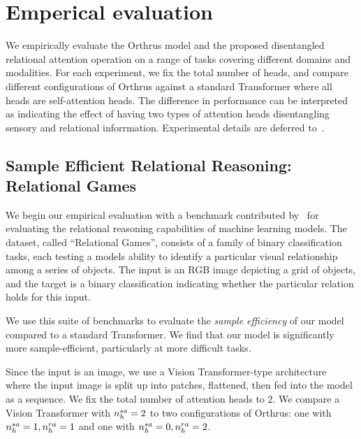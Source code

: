 \section{Emperical evaluation}\label{sec:experiments}

We empirically evaluate the Orthrus model and the proposed disentangled relational attention operation on a range of tasks covering different domains and modalities. For each experiment, we fix the total number of heads, and compare different configurations of Orthrus against a standard Transformer where all heads are self-attention heads. The difference in performance can be interpreted as indicating the effect of having two types of attention heads disentangling sensory and relational inforrmation. Experimental details are deferred to~.

\subsection{Sample Efficient Relational Reasoning: Relational Games}\label{ssec:relgames}

We begin our empirical evaluation with a benchmark contributed by~\citet{shanahanExplicitlyRelationalNeurala} for evaluating the relational reasoning capabilities of machine learning models. The dataset, called ``Relational Games'', consists of a family of binary classification tasks, each testing a models ability to identify a particular visual relationship among a series of objects. The input is an RGB image depicting a grid of objects, and the target is a binary classification indicating whether the particular relation holds for this input.


We use this suite of benchmarks to evaluate the \textit{sample efficiency} of our model compared to a standard Transformer. We find that our model is significantly more sample-efficient, particularly at more difficult tasks. %

Since the input is an image, we use a Vision Transformer-type architecture~\citep{dosovitskiyImageWorth16x162020} where the input image is split up into patches, flattened, then fed into the model as a sequence. We fix the total number of attention heads to 2. We compare a Vision Transformer with $n_h^{sa} = 2$ to two configurations of Orthrus: one with $n_h^{sa} = 1, n_h^{ra} = 1$ and one with $n_h^{sa} = 0, n_h^{ra} = 2$.

